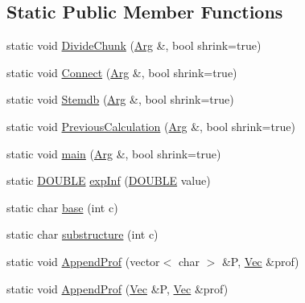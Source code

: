 \subsection*{Static Public Member Functions}
\begin{DoxyCompactItemize}
\item 
static void \hyperlink{class_rfold_1_1_paraso_r_a0306a2763aa4786030109fc675bea816}{Divide\+Chunk} (\hyperlink{class_rfold_1_1_arg}{Arg} \&, bool shrink=true)
\item 
static void \hyperlink{class_rfold_1_1_paraso_r_aadd7f8b272d8d4cb1f05dde81abd6c98}{Connect} (\hyperlink{class_rfold_1_1_arg}{Arg} \&, bool shrink=true)
\item 
static void \hyperlink{class_rfold_1_1_paraso_r_a29704ae524d5b53f70f80d858fd34f2f}{Stemdb} (\hyperlink{class_rfold_1_1_arg}{Arg} \&, bool shrink=true)
\item 
static void \hyperlink{class_rfold_1_1_paraso_r_a9ad145a89953ade89976ccf09e67de74}{Previous\+Calculation} (\hyperlink{class_rfold_1_1_arg}{Arg} \&, bool shrink=true)
\item 
static void \hyperlink{class_rfold_1_1_paraso_r_a7625cbff41b741abca32bcd3077eb851}{main} (\hyperlink{class_rfold_1_1_arg}{Arg} \&, bool shrink=true)
\item 
static \hyperlink{energy__const_8hh_a8747af38b86aa2bbcda2f1b1aa0888c2}{D\+O\+U\+B\+L\+E} \hyperlink{class_rfold_1_1_paraso_r_a5528f15d73730d9c0eef5bc54b5faa8a}{exp\+Inf} (\hyperlink{energy__const_8hh_a8747af38b86aa2bbcda2f1b1aa0888c2}{D\+O\+U\+B\+L\+E} value)
\item 
static char \hyperlink{class_rfold_1_1_paraso_r_a76352e60942c22b4f33798715c46252d}{base} (int c)
\item 
static char \hyperlink{class_rfold_1_1_paraso_r_a0efd35c6ed146739c61b5d4f56d5e8d8}{substructure} (int c)
\item 
static void \hyperlink{class_rfold_1_1_paraso_r_a8a16e5fc909cfc63b32cf026a48ef759}{Append\+Prof} (vector$<$ char $>$ \&P, \hyperlink{namespace_rfold_aaf02f2c0c40c1dd572dbdd8bc1bde67d}{Vec} \&prof)
\item 
static void \hyperlink{class_rfold_1_1_paraso_r_a2810e41e04346a40a52dee86677114f7}{Append\+Prof} (\hyperlink{namespace_rfold_aaf02f2c0c40c1dd572dbdd8bc1bde67d}{Vec} \&P, \hyperlink{namespace_rfold_aaf02f2c0c40c1dd572dbdd8bc1bde67d}{Vec} \&prof)
\end{DoxyCompactItemize}
